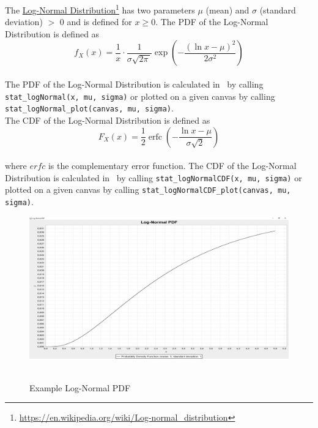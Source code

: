 		The \href{https://en.wikipedia.org/wiki/Log-normal_distribution}{Log-Normal Distribution}\footnote{\url{https://en.wikipedia.org/wiki/Log-normal_distribution}} has two parameters $\mu$ (mean) and $\sigma$ (standard deviation) $>$ 0 and is defined for $x \geq 0$. The \ac{PDF} of the Log-Normal Distribution is defined as
		\\[0.3cm]
		$$f_X(x) = \frac 1 x \cdot \frac 1 {\sigma\sqrt{2\pi\,}} \exp\left( -\frac{(\ln x-\mu)^2}{2\sigma^2} \right)$$
		\\[0.3cm]
		The \ac{PDF} of the Log-Normal Distribution is calculated in \setlx\ by calling \lstinline{stat_logNormal(x, mu, sigma)} or plotted on a given canvas by calling \lstinline{stat_logNormal_plot(canvas, mu, sigma)}.
		\\[0.3cm]
		The \ac{CDF} of the Log-Normal Distribution is defined as
		\\[0.3cm]
		$$F_X(x) = \frac12 \operatorname{erfc} \left(-\frac{\ln x - \mu}{\sigma\sqrt{2}}\right)$$
		\\[0.3cm]
		where $erfc$ is the complementary error function.
		The \ac{CDF} of the Log-Normal Distribution is calculated in \setlx\ by calling \lstinline{stat_logNormalCDF(x, mu, sigma)} or plotted on a given canvas by calling \lstinline{stat_logNormalCDF_plot(canvas, mu, sigma)}.

		\begin{figure}[H]
			\centering
			\includegraphics[width=1\textwidth]{Figures/implemented_functions/log_normal_pdf}~\\
			\caption{Example Log-Normal PDF}
			\label{fig:log_normal_pdf}
		\end{figure}


